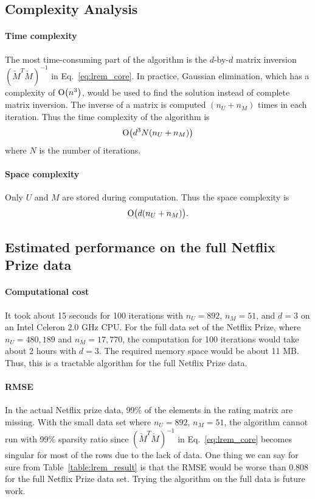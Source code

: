 \documentclass{article}
\begin{document}
\subsection{Complexity Analysis}
\paragraph{Time complexity} 
The most time-consuming part of the algorithm is the $d$-by-$d$ matrix
inversion $(\check{M}^T\check{M})^{-1}$ in Eq.~\ref{eq:lrem_core}. In
practice, Gaussian elimination, which has a complexity of $\operatorname{O}\bigl(n^3\bigr)$,
would be used to find the solution instead of complete matrix
inversion. The inverse of a matrix is computed $(n_U+n_M)$ times in
each iteration. Thus the time complexity of the algorithm is
\begin{equation}
\operatorname{O}\bigl(d^3N(n_U+n_M)\bigr)
\end{equation}
where $N$ is the number of iterations.

\paragraph{Space complexity}
Only $U$ and $M$ are stored during computation. Thus the space complexity is
\begin{equation}
\operatorname{O}\bigl(d(n_U+n_M)\bigr).
\end{equation}

\subsection{Estimated performance on the full Netflix Prize data}
\paragraph{Computational cost}
It took about 15 seconds for 100 iterations with $n_U=892$, $n_M=51$,
and $d=3$ on an Intel Celeron 2.0 GHz CPU. For the full data set of
the Netflix Prize, where $n_U=480,189$ and $n_M=17,770$, the
computation for 100 iterations would take about 2 hours with
$d=3$. The required memory space would be about 11 MB. Thus, this is a
tractable algorithm for the full Netflix Prize data.

\paragraph{RMSE}
In the actual Netflix prize data, 99\% of the elements in the rating
matrix are missing. With the small data set where $n_U=892$, $n_M=51$,
the algorithm cannot run with 99\% sparsity ratio since
$(\check{M}^T\check{M})^{-1}$ in Eq.~\ref{eq:lrem_core} becomes
singular for most of the rows due to the lack of data. One thing we
can say for sure from Table~\ref{table:lrem_result} is that the RMSE
would be worse than 0.808 for the full Netflix Prize data set. Trying
the algorithm on the full data is future work.
\end{document}
